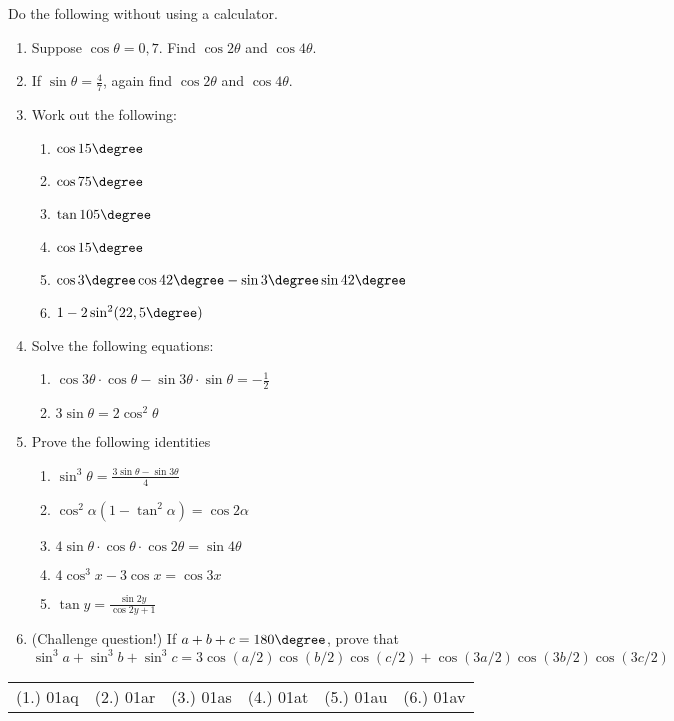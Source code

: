 \begin{eocexercises}{}
Do the following without using a calculator.
\begin{enumerate}
\item Suppose $\cos\theta=0,7$. Find $\cos 2\theta$ and $\cos 4\theta$.
\item If $\sin\theta=\frac{4}{7}$, again find $\cos 2\theta$ and $\cos 4\theta$.
\item Work out the following:
\begin{enumerate}
\item $\cos 15\degree$
\item $\cos 75\degree$
\item $\tan 105\degree$
\item $\cos 15\degree$
\item $\cos 3\degree \cos 42\degree -\sin 3\degree \sin 42\degree$
\item $1-2 \sin^2 (22,5\degree)$
\end{enumerate}
\item Solve the following equations:
\begin{enumerate}
\item $\cos 3\theta\cdot\cos\theta-\sin 3\theta\cdot\sin\theta=-\frac{1}{2}$
\item $3\sin \theta=2\cos^2\theta$

\end{enumerate}
\item Prove the following identities
\begin{enumerate}
\item $\sin^3\theta=\frac{3\sin\theta-\sin 3\theta}{4}$
\item $\cos^2\alpha (1-\tan^2\alpha)=\cos 2\alpha$
\item $4\sin\theta\cdot\cos\theta\cdot\cos 2\theta= \sin 4\theta$
\item $4\cos^3 x -3\cos x=\cos 3x$
\item $\tan y=\frac{\sin 2y}{\cos 2y+1}$
\end{enumerate}
\item (Challenge question!) If $a+b+c=180\degree$, prove that 
$$\sin^3 a+\sin^3 b+ \sin^3 c = 3\cos(a/2)\cos(b/2)\cos(c/2)+ \cos(3a/2)\cos(3b/2)\cos(3c/2)$$

\end{enumerate}









\par \practiceinfo
\par \begin{tabular}[h]{cccccc}
(1.)	01aq	&
(2.)	01ar	&
(3.)	01as	&
(4.)	01at	&
(5.)	01au	&
(6.)	01av	\\ %
\end{tabular}
\end{eocexercises}
